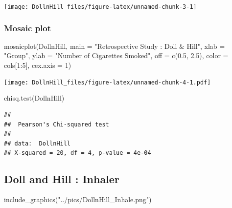 \documentclass[
]{article}
\newenvironment{Shaded}{\begin{snugshade}}{\end{snugshade}}
\newcommand{\AttributeTok}[1]{\textcolor[rgb]{0.77,0.63,0.00}{#1}}
\newcommand{\DecValTok}[1]{\textcolor[rgb]{0.00,0.00,0.81}{#1}}
\newcommand{\FloatTok}[1]{\textcolor[rgb]{0.00,0.00,0.81}{#1}}
\newcommand{\FunctionTok}[1]{\textcolor[rgb]{0.00,0.00,0.00}{#1}}
\newcommand{\NormalTok}[1]{#1}
\newcommand{\SpecialCharTok}[1]{\textcolor[rgb]{0.00,0.00,0.00}{#1}}
\newcommand{\StringTok}[1]{\textcolor[rgb]{0.31,0.60,0.02}{#1}}
\begin{document}
\begin{center}\texttt{[image: DollnHill\_files/figure-latex/unnamed-chunk-3-1]} \end{center}

\hypertarget{mosaic-plot}{%
\subsubsection{Mosaic plot}\label{mosaic-plot}}

\begin{Shaded}
\begin{Highlighting}[]
\FunctionTok{mosaicplot}\NormalTok{(DollnHill, }
           \AttributeTok{main =} \StringTok{"Retrospective Study : Doll \& Hill"}\NormalTok{, }
           \AttributeTok{xlab =} \StringTok{"Group"}\NormalTok{, }
           \AttributeTok{ylab =} \StringTok{"Number of Cigarettes Smoked"}\NormalTok{,}
           \AttributeTok{off =} \FunctionTok{c}\NormalTok{(}\FloatTok{0.5}\NormalTok{, }\FloatTok{2.5}\NormalTok{),}
           \AttributeTok{color =}\NormalTok{ cols[}\DecValTok{1}\SpecialCharTok{:}\DecValTok{5}\NormalTok{], }
           \AttributeTok{cex.axis =} \DecValTok{1}\NormalTok{)}
\end{Highlighting}
\end{Shaded}

\texttt{[image: DollnHill\_files/figure-latex/unnamed-chunk-4-1.pdf]}

\begin{Shaded}
\begin{Highlighting}[]
\FunctionTok{chisq.test}\NormalTok{(DollnHill)}
\end{Highlighting}
\end{Shaded}

\begin{verbatim}
## 
##  Pearson's Chi-squared test
## 
## data:  DollnHill
## X-squared = 20, df = 4, p-value = 4e-04
\end{verbatim}

\hypertarget{doll-and-hill-inhaler}{%
\subsection{Doll and Hill : Inhaler}\label{doll-and-hill-inhaler}}

\begin{Shaded}
\begin{Highlighting}[]
\FunctionTok{include\_graphics}\NormalTok{(}\StringTok{"../pics/DollnHill\_Inhale.png"}\NormalTok{)}
\end{Highlighting}
\end{Shaded}
\end{document}
